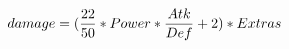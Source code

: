 \documentclass[preview]{standalone}
\begin{document}
\begin{align*}
\special{dvisvgm:raw <g id='unique000'>}damage = (\frac{22}{50} * Power * \frac{Atk}{Def} + 2) * Extras\special{dvisvgm:raw </g>}
\end{align*}
\end{document}

